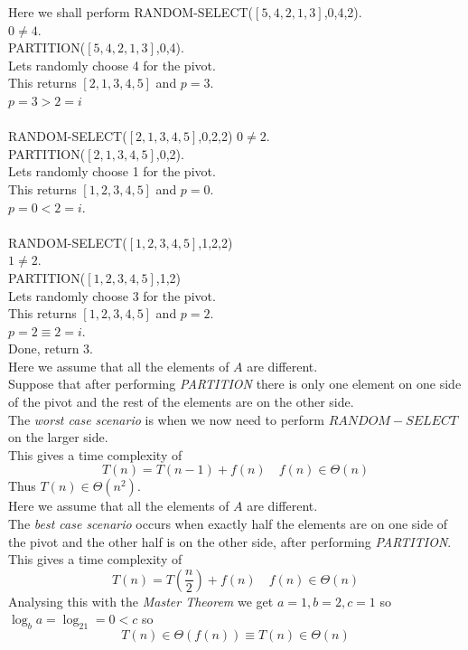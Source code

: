 \documentclass[11pt,a4paper]{article}
\begin{document}
Here we shall perform RANDOM-SELECT($[5,4,2,1,3]$,0,4,2).\\
$0\neq4$.\\
PARTITION($[5,4,2,1,3]$,0,4).\\
Lets randomly choose 4 for the pivot.\\
This returns $[2,1,3,4,5]$ and $p=3$.\\
$p=3>2=i$\\\\
RANDOM-SELECT($[2,1,3,4,5]$,0,2,2)
$0\neq2$.\\
PARTITION($[2,1,3,4,5]$,0,2).\\
Lets randomly choose 1 for the pivot.\\
This returns $[1,2,3,4,5]$ and $p=0$.\\
$p=0<2=i$.\\\\
RANDOM-SELECT($[1,2,3,4,5]$,1,2,2)\\
$1\neq2$.\\
PARTITION($[1,2,3,4,5]$,1,2)\\
Lets randomly choose 3 for the pivot.\\
This returns $[1,2,3,4,5]$ and $p=2$.\\
$p=2\equiv2=i$.\\
Done, return 3.\\

Here we assume that all the elements of $A$ are different.\\
Suppose that after performing \textit{PARTITION} there is only one element on one side of the pivot and the rest of the elements are on the other side.\\
The \textit{worst case scenario} is when we now need to perform $RANDOM-SELECT$ on the larger side.\\
This gives a time complexity of
$$T(n)=T(n-1)+f(n)\quad f(n)\in\Theta(n)$$
Thus $T(n) \in \Theta(n^2)$.\\

Here we assume that all the elements of $A$ are different.\\
The \textit{best case scenario} occurs when exactly half the elements are on one side of the pivot and the other half is on the other side, after performing \textit{PARTITION}.\\
This gives a time complexity of
$$T(n)=T\left(\frac{n}{2}\right)+f(n)\quad f(n)\in\Theta(n)$$
Analysing this with the \textit{Master Theorem} we get $a=1, b=2, c=1$ so $\log_ba=\log_21=0<c$ so $$T(n) \in\Theta(f(n)) \equiv T(n)\in\Theta(n)$$\\
\end{document}
